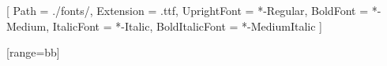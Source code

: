 \usepackage{fontspec}

\setmonofont{IBMPlexMono}[
  Path = ./fonts/,
  Extension = .ttf,
  UprightFont = *-Regular,
  BoldFont = *-Medium,
  ItalicFont = *-Italic,
  BoldItalicFont = *-MediumItalic
]

\usepackage{float}
\usepackage{booktabs}
\usepackage{mathtools}
\hypersetup{colorlinks=true,allcolors=blue}

[range=bb]
